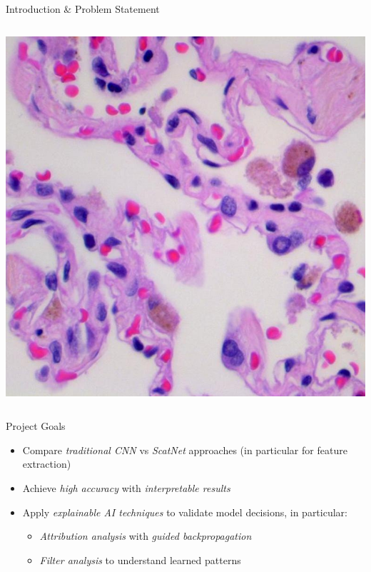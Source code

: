 \documentclass[aspectratio=169,8pt]{beamer}  %
\begin{document}
\begin{frame}{Introduction \& Problem Statement}
\begin{columns}[T]
\begin{column}{0.5\textwidth}
\vspace{0.2cm}
\hfill\includegraphics[width=0.95\linewidth, height=0.45\textheight]{imgs/benign.jpg}
\end{column}
\end{columns}
\end{frame}

\begin{frame}{Project Goals}
\begin{itemize}
\item Compare \emph{traditional CNN} vs \emph{ScatNet} approaches (in particular for feature extraction)
\item Achieve \emph{high accuracy} with \emph{interpretable results}
\item Apply \emph{explainable AI techniques} to validate model decisions, in particular:
  \begin{itemize}
  \item \emph{Attribution analysis} with \emph{guided backpropagation} 
  \item \emph{Filter analysis} to understand learned patterns
  \end{itemize}
\end{itemize}
\end{frame}
\end{document}
